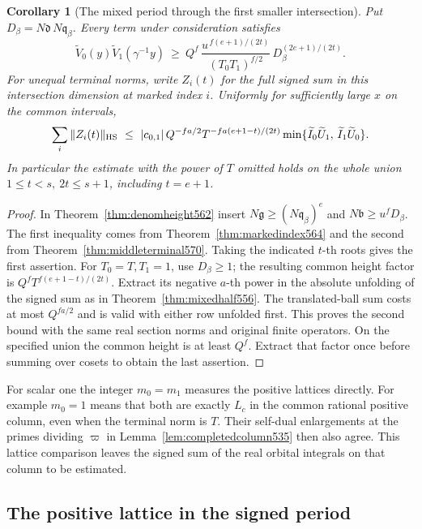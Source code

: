 \documentclass[a4paper,11pt]{article}
\newtheorem{corollary}[proposition]{Corollary}
\theoremstyle{definition}
\theoremstyle{remark}
\numberwithin{equation}{section}
\begin{document}
\begin{corollary}[The mixed period through the first smaller intersection]
\leavevmode\label{cor:middleperiod570}
Put \(D_\beta=N\mathfrak d\,N\mathfrak q_\beta\).
Every term under consideration satisfies
\[
  \widetilde V_0(y)\widetilde V_1(\gamma^{-1}y)
      \ \ge\ Q^f\,
        \frac{u^{\,f(e+1)/(2t)}}{(T_0T_1)^{f/2}}\,
        D_\beta^{(2e+1)/(2t)} .
\]
For unequal terminal norms, write \(Z_i(t)\) for the full
signed sum in this intersection dimension at marked index \(i\).
Uniformly for sufficiently large \(x\) on the common intervals,
\[
 \sum_i\|Z_i(t)\|_{\rm HS}
   \ \le\ |c_{0,1}|\,Q^{-fa/2}T^{-fa(e+1-t)/(2t)}
       \min\{\widetilde I_0\widetilde U_1,\,
                          \widetilde I_1\widetilde U_0\}.
\]
In particular the estimate with the power of \(T\) omitted
holds on the whole union \(1\le t<s,\ 2t\le s+1\),
including \(t=e+1\).
\end{corollary}
\begin{proof}
In Theorem~\ref{thm:denomheight562} insert
\(N\mathfrak g\ge(N\mathfrak q_\beta)^e\) and
\(N\mathfrak b\ge u^fD_\beta\). The first inequality
comes from Theorem~\ref{thm:markedindex564} and the
second from Theorem~\ref{thm:middleterminal570}. Taking
the indicated \(t\)-th roots gives the first assertion.
For \(T_0=T,T_1=1\), use \(D_\beta\ge1\); the resulting
common height factor is \(Q^fT^{f(e+1-t)/(2t)}\).
Extract its negative \(a\)-th power in the absolute
unfolding of the signed sum as in
Theorem~\ref{thm:mixedhalf556}. The translated-ball sum
costs at most \(Q^{fa/2}\) and is valid with either row
unfolded first. This proves the second bound with the same
real section norms and original finite operators. On the
specified union the common height is at least \(Q^f\).
Extract that factor once before summing over cosets to
obtain the last assertion.
\end{proof}

For scalar one the integer \(m_0=m_1\) measures the
positive lattices directly. For example \(m_0=1\) means
that both are exactly \(L_c\) in the common rational
positive column, even when the terminal norm is \(T\).
Their self-dual enlargements at the primes dividing
\(\varpi\) in Lemma~\ref{lem:completedcolumn535} then
also agree. This lattice comparison leaves the signed
sum of the real orbital integrals on that column to be
estimated.


\subsection{The positive lattice in the signed period}
\label{sec:positivecomparison576}
\end{document}
